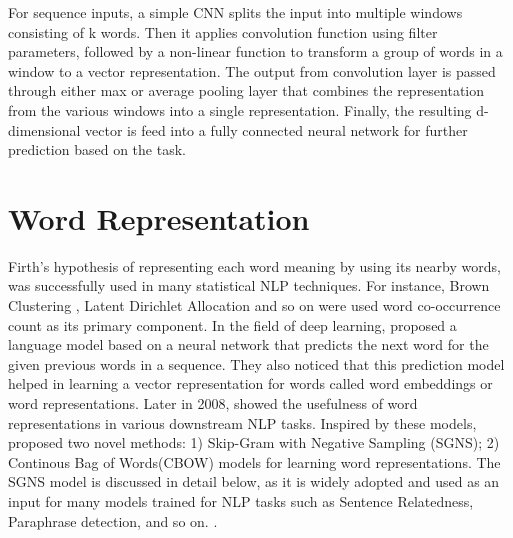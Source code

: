 \documentclass[12pt]{report} %
\begin{document}
For sequence inputs, a simple CNN splits the input into multiple windows consisting of k words. Then it applies convolution function using filter parameters, followed by a non-linear function to transform a group of words in a window to a vector representation. The output from convolution layer is passed through either max or average pooling layer that combines the representation from the various windows into a single representation. Finally, the resulting d-dimensional vector is feed into a fully connected neural network for further prediction based on the task. 

\section{Word Representation}
\label{word_rep}

Firth's hypothesis of representing each word meaning by using its nearby words, was successfully used in many statistical NLP techniques. For instance, Brown Clustering \citep{brown1992practical} , Latent Dirichlet Allocation \citep{blei2003latent} and so on were used word co-occurrence count as its primary component. In the field of deep learning, \cite{bengio2003neural} proposed a language model based on a neural network that predicts the next word for the given previous words in a sequence. They also noticed that this prediction model helped in learning a vector representation for words called word embeddings or word representations.
Later in 2008, \cite{collobert2008unified} showed the usefulness of word representations in various downstream NLP tasks.
Inspired by these models, \cite{mikolov2014word2vec} proposed two novel methods: 1) Skip-Gram with Negative Sampling (SGNS); 2) Continous Bag of Words(CBOW) models for learning word representations. The SGNS model is discussed in detail below, as it is widely adopted and used as an input for many models trained for NLP tasks such as Sentence Relatedness, Paraphrase detection, and so on. \citep{kiros2015skip}.
\end{document}
